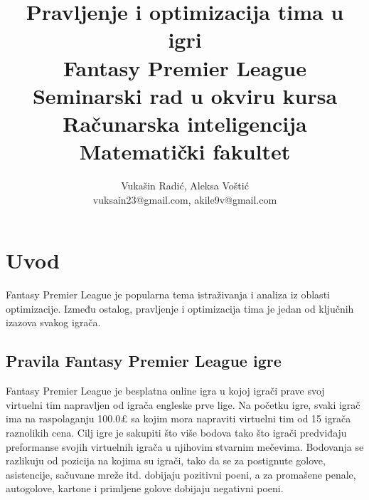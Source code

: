 \documentclass[a4paper]{article}
\begin{document}
\title{Pravljenje i optimizacija tima u igri \\
Fantasy Premier League \\ 
\vspace{2mm} \small {Seminarski rad u okviru kursa\\Računarska inteligencija\\ Matematički fakultet}}

\author{Vukašin Radić, Aleksa Voštić\\ vuksain23@gmail.com, akile9v@gmail.com}



\maketitle



\tableofcontents

\newpage




\section{Uvod}
\label{sec:uvod}

Fantasy Premier League je popularna tema istraživanja i analiza iz oblasti optimizacije. Između ostalog, pravljenje i optimizacija tima je jedan od ključnih izazova svakog igrača.

\subsection{Pravila Fantasy Premier League igre}
\vspace{3mm} 
Fantasy Premier League je besplatna online igra u kojoj igrači prave svoj virtuelni tim napravljen od igrača engleske prve lige. Na početku igre, svaki igrač ima na raspolaganju 100.0£ sa kojim mora napraviti virtuelni tim od 15 igrača raznolikih cena. Cilj igre je sakupiti što više bodova tako što igrači predviđaju preformanse svojih virtuelnih igrača u njihovim stvarnim mečevima. Bodovanja se razlikuju od pozicija na kojima su igrači, tako da se za postignute golove, asistencije, sačuvane mreže itd. dobijaju pozitivni poeni, a za promašene penale, autogolove, kartone i primljene golove dobijaju negativni poeni. \\
\end{document}
